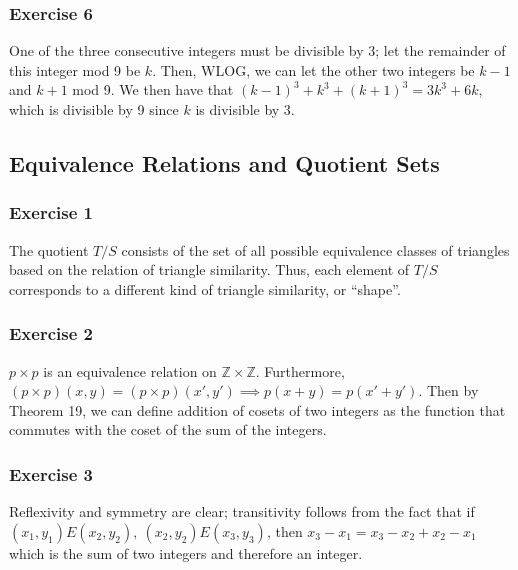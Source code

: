 \subsubsection{Exercise 6}
One of the three consecutive integers must be divisible by 3; let the remainder of this integer mod 9 be
$k$. Then, WLOG, we can let the other two integers be $k - 1$ and $k + 1$ mod 9. We then have that
$(k - 1)^3 + k^3 + (k + 1)^3 = 3k^3 + 6k$, which is divisible by 9 since $k$ is divisible by 3.

\subsection{Equivalence Relations and Quotient Sets}

\subsubsection{Exercise 1}
The quotient $T / S$ consists of the set of all possible equivalence classes of triangles
based on the relation of triangle similarity. Thus, each element of $T / S$ corresponds to a
different kind of triangle similarity, or ``shape''.

\subsubsection{Exercise 2}
$p \times p$ is an equivalence relation on $\mathbb{Z} \times \mathbb{Z}$. Furthermore,
$(p \times p) (x, y) = (p \times p) (x', y') \implies p(x + y) = p(x' + y')$.
Then by Theorem 19, we can define addition of cosets of two integers as the function
that commutes with the coset of the sum of the integers.

\subsubsection{Exercise 3}
Reflexivity and symmetry are clear; transitivity follows from the fact that if  $(x_1, y_1)E(x_2,y_2), \: 
(x_2, y_2)E(x_3, y_3)$, then $x_3 - x_1 = x_3 - x_2 + x_2 - x_1$ which is the sum of two integers and
therefore an integer. 
